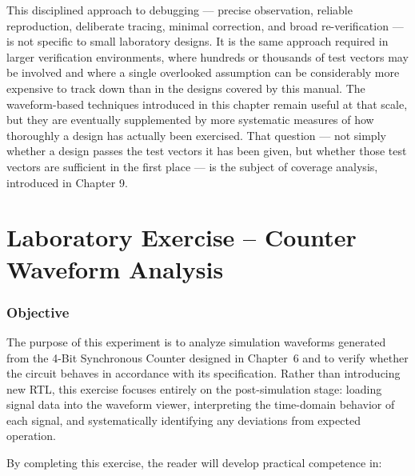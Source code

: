 This disciplined approach to debugging --- precise observation, reliable reproduction, deliberate tracing, minimal correction, and broad re-verification --- is not specific to small laboratory designs. It is the same approach required in larger verification environments, where hundreds or thousands of test vectors may be involved and where a single overlooked assumption can be considerably more expensive to track down than in the designs covered by this manual. The waveform-based techniques introduced in this chapter remain useful at that scale, but they are eventually supplemented by more systematic measures of how thoroughly a design has actually been exercised. That question --- not simply whether a design passes the test vectors it has been given, but whether those test vectors are sufficient in the first place --- is the subject of coverage analysis, introduced in Chapter 9.


\section{Laboratory Exercise -- Counter Waveform Analysis}
\label{sec:sim-lab}


\subsubsection{Objective}
\label{sec:sim-lab-objective}

The purpose of this experiment is to analyze simulation waveforms generated
from the 4-Bit Synchronous Counter designed in Chapter~6 and to verify whether
the circuit behaves in accordance with its specification. Rather than
introducing new RTL, this exercise focuses entirely on the post-simulation
stage: loading signal data into the waveform viewer, interpreting the time-domain
behavior of each signal, and systematically identifying any deviations from
expected operation.

By completing this exercise, the reader will develop practical competence in:

